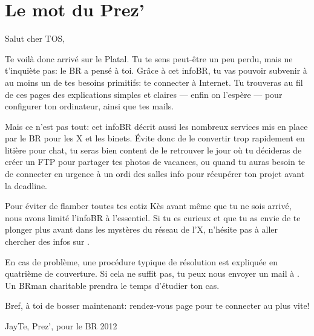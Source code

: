 \thispagestyle{empty}

\section*{Le mot du Prez'}

\vspace{1em}

Salut cher TOS,
\vspace{0.5em}

Te voil\`a donc arriv\'e sur le Platal. Tu te sens peut-être un peu perdu, mais ne t'inqui\`ete pas: le BR a pens\'e \`a toi. Gr\^ace \`a cet infoBR, tu vas pouvoir subvenir \`a au moins un de tes besoins primitifs: te connecter \`a Internet. Tu trouveras au fil de ces pages des explications simples et claires --- enfin on l'esp\`ere --- pour configurer ton ordinateur, ainsi que tes mails.

Mais ce n'est pas tout: cet infoBR d\'ecrit aussi les nombreux services mis en place par le BR pour les X et les binets. \'Evite donc de le convertir trop rapidement en liti\`ere pour chat, tu seras bien content de le retrouver le jour o\`u tu d\'ecideras de cr\'eer un FTP pour partager tes photos de vacances, ou quand tu auras besoin te de connecter en urgence à un ordi des salles info pour r\'ecup\'erer ton projet avant la deadline.

Pour \'eviter de flamber toutes tes cotiz K\`es avant m\^eme que tu ne sois arriv\'e, nous avons limit\'e l'infoBR \`a l'essentiel. Si tu es curieux et que tu as envie de te plonger plus avant dans les myst\`eres du r\'eseau de l'X, n'h\'esite pas \`a aller chercher des infos sur .

\vspace{1em}
En cas de probl\`eme, une proc\'edure typique de r\'esolution est expliqu\'ee en quatri\`eme de couverture. Si cela ne suffit pas, tu peux nous envoyer un mail \`a . Un BRman charitable prendra le temps d'\'etudier ton cas.

Bref, \`a toi de bosser maintenant: rendez-vous page \pageref{ip} pour te connecter au plus vite!

\vspace{2.5em}
\hfill JayTe, Prez', pour le BR 2012


\vfill


